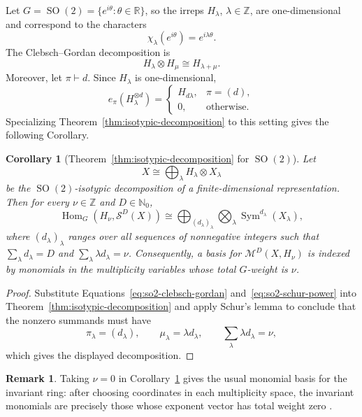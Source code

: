 \documentclass[11pt]{article}
\newcommand{\dsN}{\mathbb{N}}
\newcommand{\dsR}{\mathbb{R}}
\newcommand{\dsZ}{\mathbb{Z}}
\newcommand{\scM}{\mathcal{M}}
\newcommand{\scS}{\mathcal{S}}
\newcommand{\Sym}{\operatorname{Sym}}
\newcommand{\SO}{\operatorname{SO}}
\newtheorem{corollary}[theorem]{Corollary}
\theoremstyle{definition}
\newtheorem{remark}[theorem]{Remark}
\begin{document}
Let $G=\SO(2)=\{e^{i\theta}:\theta\in\dsR\}$, so the irreps $H_\lambda$, $\lambda\in\dsZ$, are one-dimensional and correspond to the characters
\begin{equation*}
  \chi_\lambda(e^{i\theta})=e^{i\lambda\theta}.
\end{equation*}
The Clebsch--Gordan decomposition is
\begin{equation}\label{eq:so2-clebsch-gordan}
  H_\lambda\otimes H_\mu\cong H_{\lambda+\mu}.
\end{equation}
Moreover, let $\pi\vdash d$. Since $H_\lambda$ is one-dimensional,
\begin{equation}\label{eq:so2-schur-power}
  e_\pi(H_\lambda^{\otimes d})
  =
  \begin{cases}
    H_{d\lambda}, & \pi=(d),\\
    0, & \text{otherwise}.
  \end{cases}
\end{equation}
Specializing Theorem~\ref{thm:isotypic-decomposition} to this setting gives the following Corollary.

\begin{corollary}[Theorem~\ref{thm:isotypic-decomposition} for $\SO(2)$]\label{cor:so2-isotypic-decomposition}
  Let
  \[
    X\cong \bigoplus_{\lambda}H_\lambda\otimes X_\lambda
  \]
  be the $\SO(2)$-isotypic decomposition of a finite-dimensional representation.  Then for every $\nu\in\dsZ$ and $D\in\dsN_0$,
  \[
    \operatorname{Hom}_{G}(H_\nu,\scS^D(X))
    \cong
    \bigoplus_{(d_\lambda)_{\lambda}}
    \bigotimes_{\lambda}\Sym^{d_\lambda}(X_\lambda),
  \]
  where $(d_\lambda)_\lambda$ ranges over all sequences of nonnegative integers such that $\sum_\lambda d_\lambda=D$ and $\sum_\lambda \lambda d_\lambda=\nu$.
  Consequently, a basis for $\scM^D(X,H_\nu)$ is indexed by monomials in the multiplicity variables whose total $G$-weight is $\nu$.
\end{corollary}
\begin{proof}
  Substitute Equations~\eqref{eq:so2-clebsch-gordan} and~\eqref{eq:so2-schur-power} into Theorem~\ref{thm:isotypic-decomposition} and apply Schur's lemma to conclude that the nonzero summands must have
  \[
    \pi_\lambda=(d_\lambda),\qquad
    \mu_\lambda=\lambda d_\lambda,\qquad
    \sum_\lambda \lambda d_\lambda=\nu,
  \]
  which gives the displayed decomposition.
\end{proof}

\begin{remark}
  Taking $\nu=0$ in Corollary~\ref{cor:so2-isotypic-decomposition} gives the usual monomial basis for the invariant ring: after choosing coordinates in each multiplicity space, the invariant monomials are precisely those whose exponent vector has total weight zero \cite[\S 1.4, Lemma~1.4.2]{Sturmfels2008}.
\end{remark}
\end{document}
